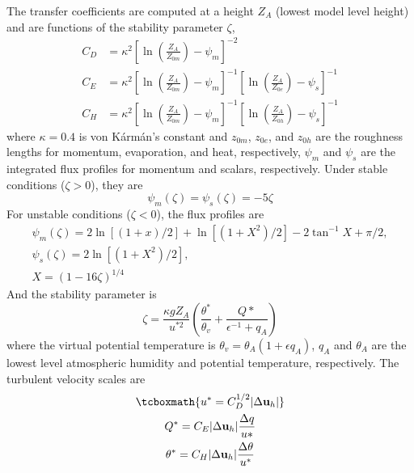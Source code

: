 \documentclass[a4paper,11pt]{article}
\begin{document}
The transfer coefficients are computed at a height $Z_A$ (lowest model level height) and are functions of the stability parameter $\zeta$,
\begin{align}
C_D &= \kappa^2\left[\ln\left(\frac{Z_A}{Z_{0m}}\right) - \psi_m\right]^{-2} \\
C_E &= \kappa^2\left[\ln\left(\frac{Z_A}{Z_{0m}}\right) - \psi_m\right]^{-1} 
			 \left[\ln\left(\frac{Z_A}{Z_{0e}}\right) - \psi_s\right]^{-1} \\
C_H &= \kappa^2\left[\ln\left(\frac{Z_A}{Z_{0m}}\right) - \psi_m\right]^{-1} 
			 \left[\ln\left(\frac{Z_A}{Z_{0h}}\right) - \psi_s\right]^{-1}			 
\end{align}
where $\kappa=0.4$ is von K\'arm\'an's constant and $z_{0m}$, $z_{0e}$, and $z_{0h}$ are the roughness lengths for momentum, evaporation, and heat, respectively, $\psi_m$ and $\psi_s$ are the integrated flux profiles for momentum and scalars, respectively.
Under stable conditions ($\zeta>0$), they are
\begin{equation}
\psi_m(\zeta) = \psi_s(\zeta) = -5\zeta
\end{equation}
For unstable conditions ($\zeta<0$), the flux profiles are
\begin{gather}
\psi_m(\zeta) = 2\ln[(1+x)/2] + \ln[(1+X^2)/2] - 2\tan^{-1}X + \pi/2,\\ 
\psi_s(\zeta) = 2\ln[(1+X^2)/2],\\
X = (1-16\zeta)^{1/4}
\end{gather} 
And the stability parameter is 
\begin{equation}
\zeta = \frac{\kappa g Z_A}{u^{*2}}\left(\frac{\theta^*}{\theta_v} + \frac{Q*}{\epsilon^{-1}+q_A}\right)
\end{equation}
where the virtual potential temperature is $\theta_v=\theta_A(1+\epsilon q_A)$, $q_A$ and $\theta_A$ are the lowest level atmospheric humidity and potential temperature, respectively. The turbulent velocity scales are
\begin{gather}
\tcboxmath{u^* = C_D^{1/2} | \Delta \mathbf{u}_h |}\\
Q^* = C_E |\Delta\mathbf{u}_h| \frac{\Delta q}{u*}\\
\theta^* = C_H |\Delta\mathbf{u}_h| \frac{\Delta \theta}{u^*}
\end{gather}
\end{document}
